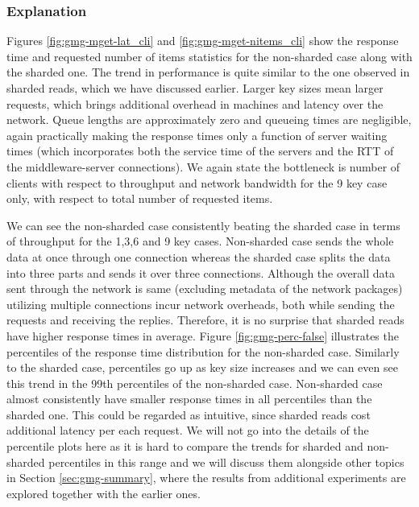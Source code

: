 \documentclass[11pt,a4paper]{article}
\begin{document}
\subsubsection{Explanation} \label{sec:gmg-false-exp}
Figures \ref{fig:gmg-mget-lat_cli} and \ref{fig:gmg-mget-nitems_cli} show the response time and requested number of items statistics for the non-sharded case along with the sharded one. The trend in performance is quite similar to the one observed in sharded reads, which we have discussed earlier. Larger key sizes mean larger requests, which brings additional overhead in machines and latency over the network. Queue lengths are approximately zero and queueing times are negligible, again practically making the response times only a function of server waiting times (which incorporates both the service time of the servers and the RTT of the middleware-server connections). We again state the bottleneck is number of clients with respect to throughput and network bandwidth for the 9 key case only, with respect to total number of requested items.
\par We can see the non-sharded case consistently beating the sharded case in terms of throughput for the 1,3,6 and 9 key cases. Non-sharded case sends the whole data at once through one connection whereas the sharded case splits the data into three parts and sends it over three connections. Although the overall data sent through the network is same (excluding metadata of the network packages) utilizing multiple connections incur network overheads, both while sending the requests and receiving the replies. Therefore, it is no surprise that sharded reads have higher response times in average.
Figure \ref{fig:gmg-perc-false} illustrates the percentiles of the response time distribution for the non-sharded case. Similarly to the sharded case, percentiles go up as key size increases and we can even see this trend in the 99th percentiles of the non-sharded case. Non-sharded case almost consistently have smaller response times in all percentiles than the sharded one. This could be regarded as intuitive, since sharded reads cost additional latency per each request. We will not go into the details of the percentile plots here as it is hard to compare the trends for sharded and non-sharded percentiles in this range and we will discuss them alongside other topics in Section \ref{sec:gmg-summary}, where the results from additional experiments are explored together with the earlier ones.
\end{document}
